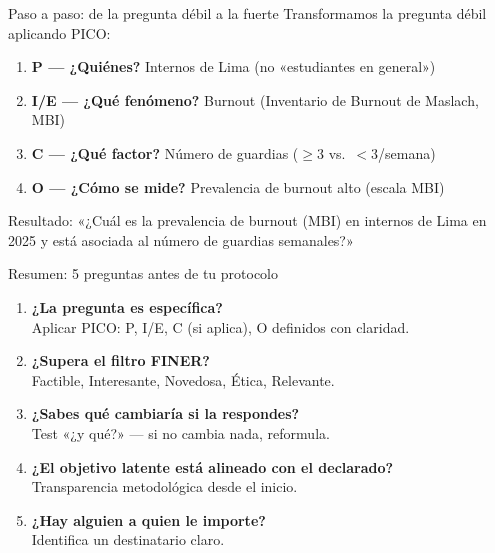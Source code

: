\documentclass[12pt, aspectratio=169]{beamer}
\begin{document}
\begin{frame}{Paso a paso: de la pregunta débil a la fuerte}
  Transformamos la pregunta débil aplicando PICO:

  \smallskip
  \begin{examplebox}
    \small
    \begin{enumerate}
      \item \textbf{P — ¿Quiénes?} Internos de Lima (no «estudiantes en general»)
      \item \textbf{I/E — ¿Qué fenómeno?} Burnout (Inventario de Burnout de Maslach, MBI)
      \item \textbf{C — ¿Qué factor?} Número de guardias ($\geq 3$ vs.\ $<3$/semana)
      \item \textbf{O — ¿Cómo se mide?} Prevalencia de burnout alto (escala MBI)
    \end{enumerate}
  \end{examplebox}

  \smallskip
  \begin{keybox}
    \small
    Resultado: «¿Cuál es la prevalencia de burnout (MBI) en internos
    de Lima en 2025 y está asociada al número de guardias semanales?»
  \end{keybox}
\end{frame}


\begin{frame}{Resumen: 5 preguntas antes de tu protocolo}
  \begin{keybox}
    \begin{enumerate}
      \item \textbf{¿La pregunta es específica?}\\
            \small Aplicar PICO: P, I/E, C (si aplica), O definidos con claridad.
      \normalsize
      \item \textbf{¿Supera el filtro FINER?}\\
            \small Factible, Interesante, Novedosa, Ética, Relevante.
      \normalsize
      \item \textbf{¿Sabes qué cambiaría si la respondes?}\\
            \small Test «¿y qué?» — si no cambia nada, reformula.
      \normalsize
      \item \textbf{¿El objetivo latente está alineado con el declarado?}\\
            \small Transparencia metodológica desde el inicio.
      \normalsize
      \item \textbf{¿Hay alguien a quien le importe?}\\
            \small Identifica un destinatario claro.
    \end{enumerate}
  \end{keybox}
\end{frame}
\end{document}
